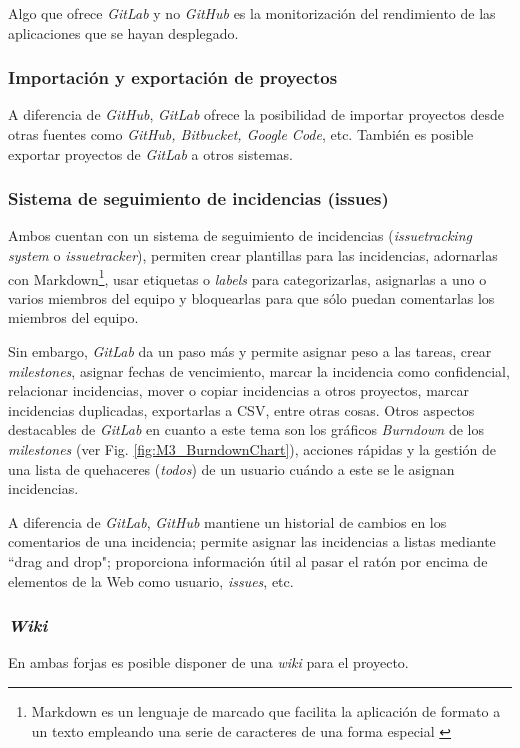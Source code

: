 Algo que ofrece \textit{GitLab} y no \textit{GitHub} es la monitorización del rendimiento de las aplicaciones que se hayan desplegado.

\subsubsection{Importación y exportación de proyectos}
A diferencia de \textit{GitHub}, \textit{GitLab} ofrece la posibilidad de importar proyectos desde otras fuentes como \textit{GitHub, Bitbucket, Google Code}, etc. También es posible exportar proyectos de \textit{GitLab} a otros sistemas.

\subsubsection{Sistema de seguimiento de incidencias (issues)}
Ambos cuentan con un sistema de seguimiento de incidencias (\textit{\textit{issue}tracking system} o \textit{\textit{issue}tracker}), permiten crear plantillas para las incidencias, adornarlas con Markdown\footnote{Markdown es un lenguaje de marcado que facilita la aplicación de formato a un texto empleando una serie de caracteres de una forma especial \cite{lasso_que_2013}}, usar etiquetas o \textit{labels} para categorizarlas, asignarlas a uno o varios miembros del equipo y bloquearlas para que sólo puedan comentarlas los miembros del equipo.

Sin embargo, \textit{GitLab} da un paso más y permite asignar peso a las tareas, crear \textit{milestones}, asignar fechas de vencimiento, marcar la incidencia como confidencial, relacionar incidencias, mover o copiar incidencias a otros proyectos, marcar incidencias duplicadas, exportarlas a CSV, entre otras cosas. Otros aspectos destacables de \textit{GitLab} en cuanto a este tema son los gráficos \textit{Burndown} de los \textit{milestones} (ver Fig. \ref{fig:M3_BurndownChart}), acciones rápidas y la gestión de una lista de quehaceres (\textit{todos}) de un usuario cuándo a este se le asignan incidencias.


A diferencia de \textit{GitLab}, \textit{GitHub} mantiene un historial de cambios en los comentarios de una incidencia; permite asignar las incidencias a listas mediante ``drag and drop"; proporciona información útil al pasar el ratón por encima de elementos de la Web como usuario, \textit{issues}, etc.

\subsubsection{\textit{Wiki}}
En ambas forjas es posible disponer de una \textit{wiki} para el proyecto.

